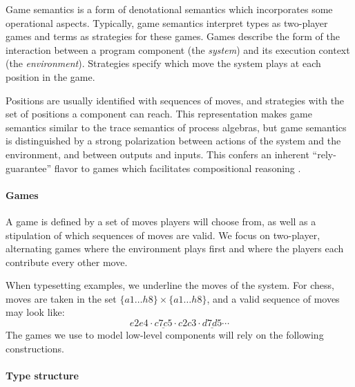 \documentclass[sigplan,screen,review]{acmart}
\begin{document}

Game semantics is a form of denotational semantics which
incorporates some operational aspects.
Typically,
game semantics interpret
types as two-player games
and terms as strategies for these games.
Games describe the form of the interaction
between a program component %
(the \emph{system})
and its execution context
(the \emph{environment}).
Strategies
specify which move the system plays
at each position in the game.

Positions are usually identified with sequences of moves,
and strategies with the set of positions
a component can reach.
This representation makes
game semantics similar to
the trace semantics of process algebras,
but game semantics is distinguished
by a strong polarization between
actions of the system and the environment,
and between outputs and inputs.
This confers an inherent ``rely-guarantee'' flavor
to games which facilitates compositional reasoning
\cite{cspgs}.


\paragraph{Games} \label{sec:mainideas:gs:games} %

A game is defined by a set of moves
players will choose from,
as well as a stipulation of which
sequences of moves are valid.
We focus on two-player, alternating games
where the environment plays first and
where the players
each contribute every other move.

When typesetting examples,
we underline the moves of the system.
For chess,
moves are taken in the set $\{a1 \ldots h8\} \times \{a1 \ldots h8\}$,
and a valid sequence of moves may look like:
\[ e2e4 \cdot \underline{c7c5} \cdot c2c3 \cdot \underline{d7d5} \cdots \]
The games we use to model low-level components
will rely on the following constructions.


\paragraph{Type structure} \label{sec:mainideas:gs:types} %
\end{document}
